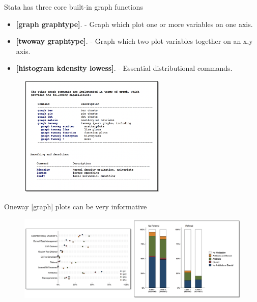 \documentclass[aspectratio=169]{beamer}
\begin{document}
\begin{frame}{Stata has three core built-in graph functions}
	\begin{multicols}{2}	
			
			\begin{itemize}[<default overlay specification>]
			\item<1> \textbf{[graph graphtype]}.
				\newline - Graph which plot one or more variables on one axis.
			\item<1> \textbf{[twoway graphtype]}.
				\newline - Graph which two plot variables together on an x,y axis.
			\item<1> \textbf{[histogram kdensity lowess]}.
				\newline - Essential distributional commands.
		\end{itemize}
		
		\begin{figure}
			\centering
			\includegraphics[width=70mm]{img/Function}
		\end{figure}
		
	\end{multicols}
\end{frame}


\begin{frame}{Oneway [graph] plots can be very informative}
	
	\begin{figure}
		\centering
		\includegraphics[width=\linewidth]{img/Graph2}
	\end{figure}
	
\end{frame}
\end{document}
